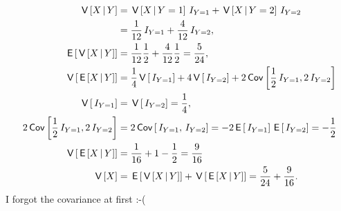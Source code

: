\documentclass[lectures]{subfiles}
\begin{document}
\begin{exercise}
\begin{solution}
\begin{align}
\V{X\given Y} &= \V{X\given Y=1}\1{Y=1} + \V{X\given Y=2}\1{Y=2} \\
&= \frac{1}{12} \1{Y=1} + \frac{4}{12} \1{Y=2}, \\
\E{\V{X\given Y}} &= \frac{1}{12} \frac{1}{2} + \frac{4}{12} \frac{1}{2} = \frac{5}{24}, \\
\V{\E{X \given Y}} &= \frac{1}{4}\V{\1{Y=1}} + 4\V{\1{Y=2}} + 2\cov{\frac{1}{2}\1{Y=1}, 2\1{Y=2}} \\
\V{\1{Y=1}} &= \V{\1{Y=2}}  = \frac{1}{4}, \\
2\cov{\frac{1}{2}\1{Y=1}, 2\1{Y=2}} &= 2\cov{\1{Y=1}, \1{Y=2}}=-2\E{\1{Y=1}}\E{\1{Y=2}} = -\frac{1}{2}\\
\V{\E{X \given Y}} &= \frac{1}{16} + 1 - \frac{1}{2} = \frac{9}{16}\\
\V X &= \E{\V{X\given Y}} + \V{\E{X\given Y}} = \frac{5}{24} + \frac{9}{16}.
\end{align}
I forgot the covariance at first :-(
\end{solution}
\end{exercise}
\end{document}
